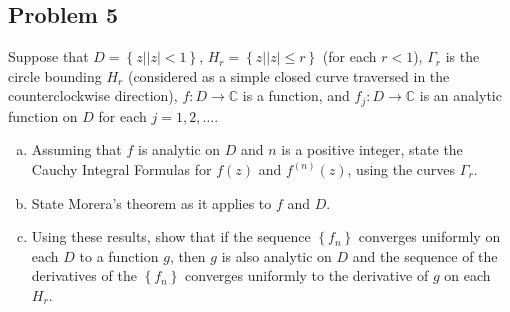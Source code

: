 \documentclass[12pt]{article}
\newcommand{\cx}{\mathbb{C}}
\newcommand\setb[1]{\left \{ #1 \right \}}
\theoremstyle{definition}
\begin{document}
\subsection{Problem 5}
Suppose that $D = \setb{ z | |z| < 1 }$, $H_r = \setb{ z | |z| \leq r }$ (for each $r < 1$), $\Gamma_r$ is the circle bounding $H_r$ (considered as a simple closed curve traversed in the counterclockwise direction), $f : D \to \cx$ is a function, and $f_j : D \to \cx$ is an analytic function on $D$ for each $j = 1 , 2 , \dotsc$.
\begin{enumerate}[a.]
    \item Assuming that $f$ is analytic on $D$ and $n$ is a positive integer, state the Cauchy Integral Formulas for $f(z)$ and $f^{(n)}(z)$, using the curves $\Gamma_r$.
    \item State Morera's theorem as it applies to $f$ and $D$.
    \item Using these results, show that if the sequence $\setb{ f_n }$ converges uniformly on each $D$ to a function $g$, then $g$ is also analytic on $D$ and the sequence of the derivatives of the $\setb{ f_n }$ converges uniformly to the derivative of $g$ on each $H_r$.
\end{enumerate}
\end{document}
